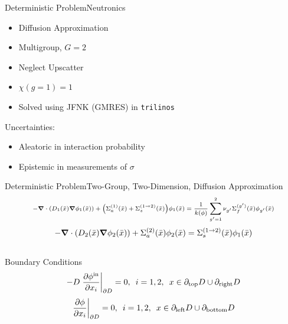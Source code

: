 \documentclass{beamer}
\newcommand{\xs}[2]{\ensuremath{\Sigma_{#1}^{(#2)}}}
\begin{document}
\begin{frame}{Deterministic Problem}{Neutronics}
\begin{itemize}\vspace{-30pt}
\item Diffusion Approximation
\item Multigroup, $G=2$
\item Neglect Upscatter
\item $\chi(g=1)=1$
\item Solved using JFNK (GMRES) in \texttt{trilinos}
\end{itemize}\vspace{10pt}
Uncertainties:
\begin{itemize}
\item Aleatoric in interaction probability
\item Epistemic in measurements of $\sigma$
\end{itemize}
\end{frame}

\begin{frame}{Deterministic Problem}{Two-Group, Two-Dimension, Diffusion Approximation}
\vspace{-30pt}
\begin{equation} \scriptsize
-\grad\cdot\qty( D_1(\bar x)\grad\phi_1(\bar x))+\qty(\xs{a}{1}(\bar x)+\xs{s}{1\to2}(\bar x))\phi_1(\bar x) = \frac{1}{k(\phi)}\sum_{g'=1}^2\nu_{g'}\xs{f}{g'}(\bar x)\phi_{g'}(\bar x) \nonumber
\end{equation}
\begin{equation}
-\grad \cdot\qty(D_2(\bar x)\grad \phi_2(\bar x))+\xs{a}{2}(\bar x)\phi_2(\bar x) = \xs{s}{1\to 2}(\bar x)\phi_1(\bar x)\nonumber
\end{equation}\\\vspace{10pt}
Boundary Conditions%
\begin{equation}
-D\eval{\pdv{\phi^{\text{in}}}{x_i}}_{\partial D}=0,\hspace{5pt}i=1,2,\hspace{5pt}
    x\in\partial_\text{top}D\cup\partial_\text{right}D\nonumber
\end{equation}
\begin{equation}
\eval{\pdv{\phi}{x_i}}_{\partial D}=0,\hspace{5pt}i=1,2,\hspace{5pt}
    x\in\partial_\text{left}D\cup\partial_\text{bottom}D\nonumber
\end{equation}
\end{frame}
\end{document}
